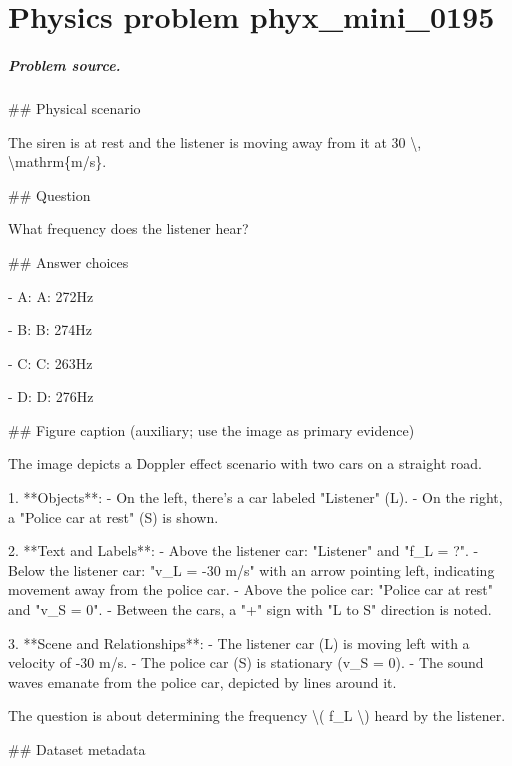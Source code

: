 
\chapter{Physics problem phyx\_mini\_0195}
\label{ch:PhyXMiniProblems_problem_phyx_mini_0195}

\paragraph{Problem source.}
\#\# Physical scenario

The siren is at rest and the listener is moving away from it at 30 \textbackslash{}, \textbackslash{}mathrm\{m/s\}.

\#\# Question

What frequency does the listener hear?

\#\# Answer choices

- A: A: 272Hz

- B: B: 274Hz

- C: C: 263Hz

- D: D: 276Hz

\#\# Figure caption (auxiliary; use the image as primary evidence)

The image depicts a Doppler effect scenario with two cars on a straight road.

1. **Objects**:
   - On the left, there's a car labeled "Listener" (L).
   - On the right, a "Police car at rest" (S) is shown.

2. **Text and Labels**:
   - Above the listener car: "Listener" and "f\_L = ?".
   - Below the listener car: "v\_L = -30 m/s" with an arrow pointing left, indicating movement away from the police car.
   - Above the police car: "Police car at rest" and "v\_S = 0".
   - Between the cars, a "+" sign with "L to S" direction is noted.

3. **Scene and Relationships**:
   - The listener car (L) is moving left with a velocity of -30 m/s.
   - The police car (S) is stationary (v\_S = 0).
   - The sound waves emanate from the police car, depicted by lines around it. 

The question is about determining the frequency \textbackslash{}( f\_L \textbackslash{}) heard by the listener.

\#\# Dataset metadata

